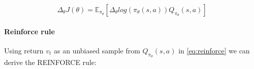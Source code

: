 \begin{equation} \label{eq:reinforce}
	\Delta_{\theta} J(\theta) = \mathbb{E}_{\pi_{\theta}}
		[\Delta_{\theta} log(
		\pi_{\theta}(s, a) )  Q_{\pi_{\theta}}(s, a)]
\end{equation}


\paragraph{Reinforce rule}
Using return $v_t$ as an unbiased sample from $Q_{\pi_{\theta}}(s, a)$
in \ref{eq:reinforce} we can derive the REINFORCE rule:

%
%


%







%


